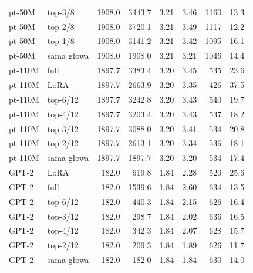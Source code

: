 {\begin{longtable}{@{}llrrrrrr@{}}
pt-50M & top-3/8 & 1908.0 & 3443.7 & 3.21 & 3.46 & 1160 & 13.3 \\
pt-50M & top-2/8 & 1908.0 & 3720.1 & 3.21 & 3.49 & 1117 & 12.2 \\
pt-50M & top-1/8 & 1908.0 & 3141.2 & 3.21 & 3.42 & 1095 & 16.1 \\
pt-50M & sama głowa & 1908.0 & 1908.0 & 3.21 & 3.21 & 1046 & 14.4 \\
pt-110M & full & 1897.7 & 3383.4 & 3.20 & 3.45 & 535 & 23.6 \\
pt-110M & LoRA & 1897.7 & 2663.9 & 3.20 & 3.35 & 426 & 37.5 \\
pt-110M & top-6/12 & 1897.7 & 3242.8 & 3.20 & 3.43 & 540 & 19.7 \\
pt-110M & top-4/12 & 1897.7 & 3203.4 & 3.20 & 3.43 & 537 & 18.2 \\
pt-110M & top-3/12 & 1897.7 & 3088.0 & 3.20 & 3.41 & 534 & 20.8 \\
pt-110M & top-2/12 & 1897.7 & 2613.1 & 3.20 & 3.34 & 536 & 18.1 \\
pt-110M & sama głowa & 1897.7 & 1897.7 & 3.20 & 3.20 & 534 & 17.4 \\
GPT-2 & LoRA & 182.0 & 619.8 & 1.84 & 2.28 & 520 & 25.6 \\
GPT-2 & full & 182.0 & 1539.6 & 1.84 & 2.60 & 634 & 13.5 \\
GPT-2 & top-6/12 & 182.0 & 440.3 & 1.84 & 2.15 & 626 & 16.4 \\
GPT-2 & top-3/12 & 182.0 & 298.7 & 1.84 & 2.02 & 636 & 16.5 \\
GPT-2 & top-4/12 & 182.0 & 342.3 & 1.84 & 2.07 & 628 & 15.7 \\
GPT-2 & top-2/12 & 182.0 & 209.3 & 1.84 & 1.89 & 626 & 11.7 \\
GPT-2 & sama głowa & 182.0 & 182.0 & 1.84 & 1.84 & 630 & 14.0 \\
\end{longtable}
}

